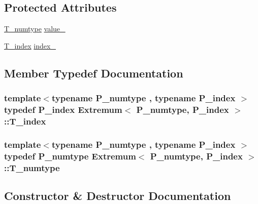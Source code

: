 \subsection*{Protected Attributes}
\begin{DoxyCompactItemize}
\item 
\hyperlink{classExtremum_a305d678d8ea32a4b05f0dcb1c078b0c1}{T\+\_\+numtype} \hyperlink{classExtremum_a85c3dcbf818d0ac6d587907fa250c84e}{value\+\_\+}
\item 
\hyperlink{classExtremum_abede57c47b4f9968a97bd2758b76589c}{T\+\_\+index} \hyperlink{classExtremum_ad8c76332d27149d8550b463d710c55a5}{index\+\_\+}
\end{DoxyCompactItemize}


\subsection{Member Typedef Documentation}
\hypertarget{classExtremum_abede57c47b4f9968a97bd2758b76589c}{}
\subsubsection[{T\+\_\+index}]{\setlength{\rightskip}{0pt plus 5cm}template$<$typename P\+\_\+numtype , typename P\+\_\+index $>$ typedef P\+\_\+index {\bf Extremum}$<$ P\+\_\+numtype, P\+\_\+index $>$\+::{\bf T\+\_\+index}}\label{classExtremum_abede57c47b4f9968a97bd2758b76589c}
\hypertarget{classExtremum_a305d678d8ea32a4b05f0dcb1c078b0c1}{}
\subsubsection[{T\+\_\+numtype}]{\setlength{\rightskip}{0pt plus 5cm}template$<$typename P\+\_\+numtype , typename P\+\_\+index $>$ typedef P\+\_\+numtype {\bf Extremum}$<$ P\+\_\+numtype, P\+\_\+index $>$\+::{\bf T\+\_\+numtype}}\label{classExtremum_a305d678d8ea32a4b05f0dcb1c078b0c1}


\subsection{Constructor \& Destructor Documentation}
\hypertarget{classExtremum_a1c4eaf1dba59d473645b87e9d7f4dff6}{}
